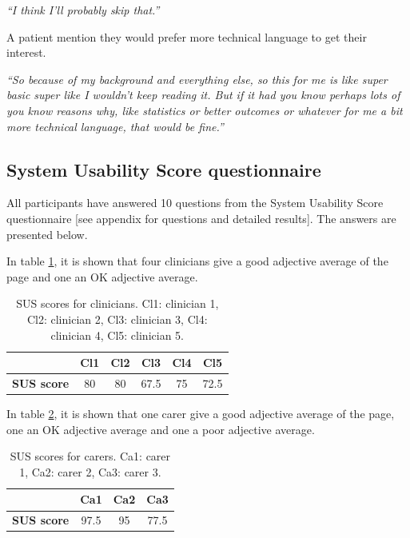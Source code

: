 \documentclass{sigchi}
\begin{document}
\textit{“I think I’ll probably skip that.”}

A patient mention they would prefer more technical language to get their interest.

\textit{“So because of my background and everything else, so this for me is like super basic super like I wouldn’t keep reading it. But if it had you know perhaps lots of you know reasons why, like statistics or better outcomes or whatever for me a bit more technical language, that would be fine.”}

\subsection{System Usability Score questionnaire}
All participants have answered 10 questions from the System Usability Score questionnaire [see appendix for questions and detailed results]. The answers are presented below.

In table \ref{tab:ClincicianSUS}, it is shown that four clinicians give a good adjective average of the page and one an OK adjective average.

\begin{table}[H]
    \centering
    \begin{tabular}{|c|c|c|c|c|c|}
    \hline
        & \textbf{Cl1} & \textbf{Cl2} & \textbf{Cl3} & \textbf{Cl4} & \textbf{Cl5}\\
    \hline
         \textbf{SUS score}  & 80 & 80 & 67.5 & 75 & 72.5\\
    \hline
    \end{tabular}
    \caption{SUS scores for clinicians. Cl1: clinician 1, Cl2: clinician 2, Cl3: clinician 3, Cl4: clinician 4, Cl5: clinician 5.}
    \label{tab:ClincicianSUS}
\end{table}

In table \ref{tab:CarerSUS}, it is shown that one carer give a good adjective average of the page, one an OK adjective average and one a poor adjective average.

\begin{table}[H]
    \centering
    \begin{tabular}{|c|c|c|c|}
    \hline
        & \textbf{Ca1} & \textbf{Ca2} & \textbf{Ca3}\\
    \hline
         \textbf{SUS score} & 97.5 & 95 & 77.5\\
    \hline
    \end{tabular}
    \caption{SUS scores for carers. Ca1: carer 1, Ca2: carer 2, Ca3: carer 3.}
    \label{tab:CarerSUS}
\end{table}
\end{document}
